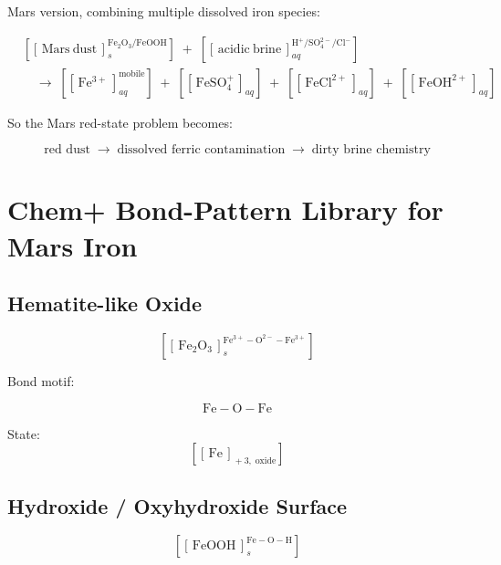 \documentclass[11pt,a4paper]{article}
\newcommand{\cid}[3]{\!\left[\!\left[\,#1\,\right]^{\!#2}_{\!#3}\!\right]}
\newcommand{\cidb}[2]{\!\left[\!\left[\,#1\,\right]_{\!#2}\!\right]}
\begin{document}
Mars version, combining multiple dissolved iron species:

\begin{align*}
&\cid{\mathrm{Mars~dust}}{\mathrm{Fe_2O_3/FeOOH}}{s}
 \;+\;\cid{\mathrm{acidic~brine}}{\mathrm{H^+/SO_4^{2-}/Cl^-}}{aq}\\[6pt]
&\quad\rightarrow\;
  \cid{\mathrm{Fe^{3+}}}{\text{mobile}}{aq}
  \;+\;\cidb{\mathrm{FeSO_4^+}}{aq}
  \;+\;\cidb{\mathrm{FeCl^{2+}}}{aq}
  \;+\;\cidb{\mathrm{FeOH^{2+}}}{aq}
\end{align*}

So the Mars red-state problem becomes:

\begin{keybox}
\[
\text{red dust}
\;\rightarrow\;
\text{dissolved ferric contamination}
\;\rightarrow\;
\text{dirty brine chemistry}
\]
\end{keybox}

\section{Chem+ Bond-Pattern Library for Mars Iron}

\subsection{Hematite-like Oxide}

\[
\cid{\mathrm{Fe_2O_3}}{\mathrm{Fe^{3+}{-}O^{2-}{-}Fe^{3+}}}{s}
\]

Bond motif:
\begin{keybox}
\[\mathrm{Fe{-}O{-}Fe}\]
\end{keybox}

State:
\[
\cidb{\mathrm{Fe}}{+3,\;\text{oxide}}
\]

\subsection{Hydroxide / Oxyhydroxide Surface}

\[
\cid{\mathrm{FeOOH}}{\mathrm{Fe{-}O{-}H}}{s}
\]
\end{document}
